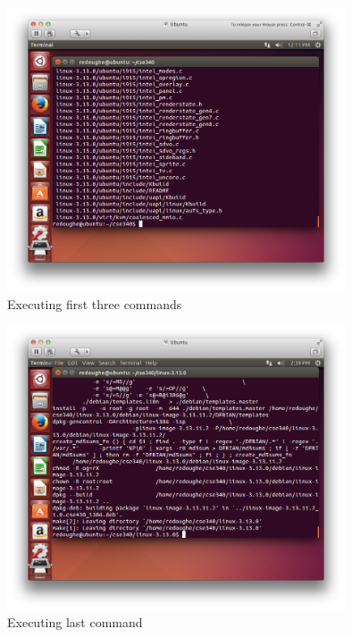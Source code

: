 \documentclass[12pt]{article}
\newcommand{\imagesize}{100mm}
\begin{document}
\begin{figure}
\centering
\includegraphics[width=\imagesize]{7.jpg}
\caption{Executing first three commands}
\end{figure}

\begin{figure}
\centering
\includegraphics[width=\imagesize]{8.jpg}
\caption{Executing last command}
\end{figure}

\newpage
\end{document}
